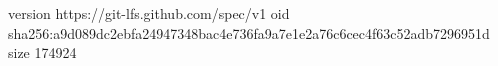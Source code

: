 version https://git-lfs.github.com/spec/v1
oid sha256:a9d089dc2ebfa24947348bac4e736fa9a7e1e2a76c6cec4f63c52adb7296951d
size 174924
